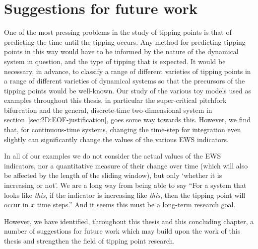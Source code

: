 \section{Suggestions for future work}

One of the most pressing problems in the study of tipping points is that of predicting the time until the tipping occurs. Any method for predicting tipping points in this way would have to be informed by the nature of the dynamical system in question, and the type of tipping that is expected. It would be necessary, in advance, to classify a range of different varieties of tipping points in a range of different varieties of dynamical systems so that the precursors of the tipping points would be well-known. Our study of the various toy models used as examples throughout this thesis, in particular the super-critical pitchfork bifurcation and the general, discrete-time two-dimensional system in section~\ref{sec:2D:EOF-justification}, goes some way towards this. However, we find that, for continuous-time systems, changing the time-step for integration even slightly can significantly change the values of the various EWS indicators. 

In all of our examples we do not consider the actual values of the EWS indicators, nor a quantitative measure of their change over time (which will also be affected by the length of the sliding window), but only `whether it is increasing or not'. We are a long way from being able to say ``For a system that looks like \emph{this}, if the indicator is increasing like \emph{this}, then the tipping point will occur in $x$ time steps.''  And it seems this must be a long-term research goal.

However, we have identified, throughout this thesis and this concluding chapter, a number of suggestions for future work which may build upon the work of this thesis and strengthen the field of tipping point research. 

